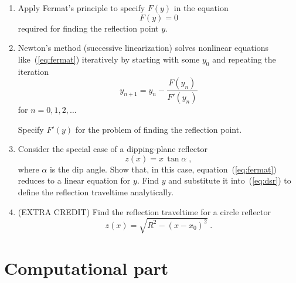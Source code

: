 \begin{enumerate}
  \begin{enumerate}
  \item Apply Fermat's principle to specify $F(y)$ in the equation
    \begin{equation}
	\label{eq:fermat}
	    F(y) = 0
      \end{equation}
      required for finding the reflection point $y$.

    \item Newton's method (successive linearization) solves nonlinear
    equations like~(\ref{eq:fermat}) iteratively by starting with some
    $y_0$ and repeating the iteration
      \begin{equation}
      \label{eq:newton}
        y_{n+1} = y_n - \frac{F(y_n)}{F'(y_n)}
      \end{equation}
      for $n=0,1,2,\ldots$ 

      Specify $F'(y)$ for the problem of finding the reflection point.

    \item Consider the special case of a dipping-plane reflector 
\begin{equation}
\label{eq:plane}
z(x) = x\,\tan{\alpha}\;,
\end{equation}
 where $\alpha$ is the dip angle. Show that, in
    this case, equation~(\ref{eq:fermat}) reduces to a linear equation
    for $y$. Find $y$ and substitute it into~(\ref{eq:dsr}) to define the 
    reflection traveltime analytically.

\item (EXTRA CREDIT) Find the reflection traveltime for a circle reflector
\begin{equation}
\label{eq:circle}
z(x) = \sqrt{R^2 - (x-x_0)^2}\;.
\end{equation}

\end{enumerate}
\end{enumerate}

\section{Computational part}

